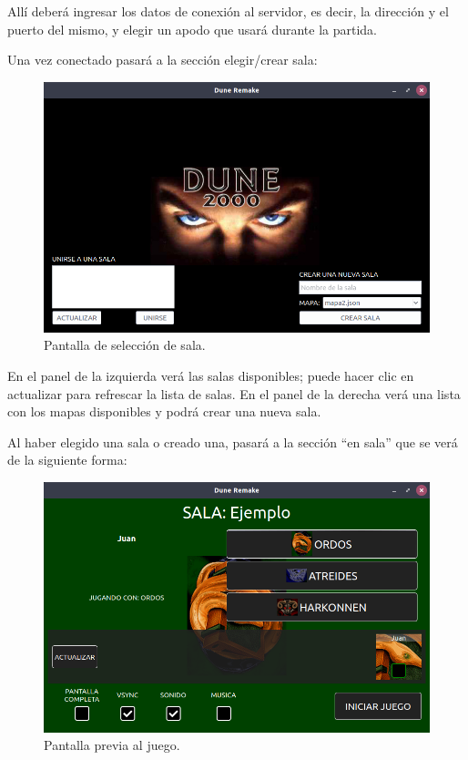\documentclass[titlepage,a4paper,12pt]{article}
\begin{document}
Allí deberá ingresar los datos de conexión al servidor, es decir, la dirección y el puerto del mismo, y elegir un apodo que usará durante la partida.

Una vez conectado pasará a la sección elegir/crear sala:
\begin{figure}[H]
	\centering
	\includegraphics[width=12cm]{../imagenes/lanzador-cliente-elegir-sala.png}
	\caption{\label{fig:lanzador-cliente-elegir-sala} Pantalla de selección de sala.}
\end{figure}

En el panel de la izquierda verá las salas disponibles; puede hacer clic en actualizar para refrescar la lista de salas. En el panel de la derecha verá una lista con los mapas disponibles y podrá crear una nueva sala.

Al haber elegido una sala o creado una, pasará a la sección ``en sala'' que se verá de la siguiente forma:
\begin{figure}[H]
	\centering
	\includegraphics[width=12cm]{../imagenes/lanzador-cliente-en-sala.png}
	\caption{\label{fig:lanzador-cliente-en-sala} Pantalla previa al juego.}
\end{figure}
\end{document}
